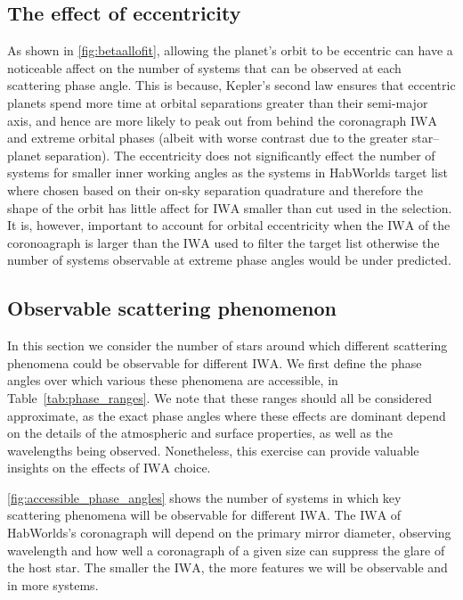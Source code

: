 \documentclass[
    usenatbib,
]{mnras}
\newcommand{\IWA}{\ensuremath{\mathrm{IWA}}}
\newcommand{\hwo}{HabWorlds}
\begin{document}
\subsection{The effect of eccentricity}
\label{sec:result_eccentricity}
As shown in \cref{fig:betaallofit}, allowing the planet's orbit to be eccentric can have a noticeable affect on the number of systems that can be observed at each scattering phase angle.
%
This is because, Kepler's second law ensures that eccentric planets spend more time at orbital separations greater than their semi-major axis, and hence are more likely to peak out from behind the coronagraph \IWA{} and extreme orbital phases (albeit with worse contrast due to the greater star--planet separation).
%
The eccentricity does not significantly effect the number of systems for smaller inner working angles as the systems in \hwo{} target list where chosen based on their on-sky separation quadrature and therefore the shape of the orbit has little affect for \IWA{} smaller than cut used in the selection. It is, however, important to account for orbital eccentricity when the \IWA{} of the coronoagraph is larger than the \IWA{} used to filter the target list otherwise the number of systems observable at extreme phase angles would be under predicted.


\subsection{Observable scattering phenomenon}
\label{sec:results_scattering_phenomena}

In this section we consider the number of stars around which different scattering phenomena could be observable for different \IWA{}.
%
We first define the phase angles over which various these phenomena are accessible, in Table~\ref{tab:phase_ranges}.
%
We note that these ranges should all be considered approximate, as the exact phase angles where these effects are dominant depend on the details of the atmospheric and surface properties, as well as the wavelengths being observed.
%
Nonetheless, this exercise can provide valuable insights on the effects of \IWA{} choice. 

\cref{fig:accessible_phase_angles} shows the number of systems in which key scattering phenomena will be observable for different \IWA{}.
%
The \IWA{} of \hwo's coronagraph will depend on the primary mirror diameter, observing wavelength and how well a coronagraph of a given size can suppress the glare of the host star.
%
The smaller the \IWA{}, the more features we will be observable and in more systems. 
\end{document}
